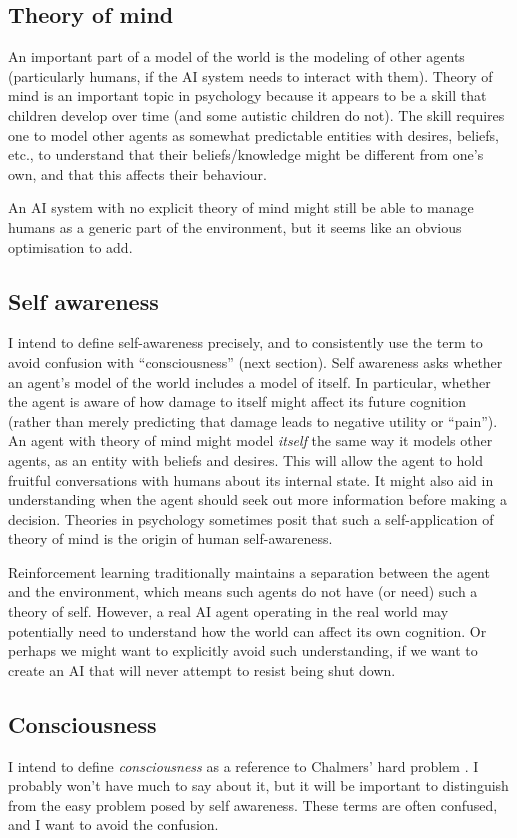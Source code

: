\documentclass[10pt,a4paper]{article}
\newcommand{\nquote}[1]{``{#1}''}
\begin{document}
\subsection{Theory of mind}
An important part of a model of the world is the modeling of other agents (particularly humans, if the AI system needs to interact with them). Theory of mind is an important topic in psychology because it appears to be a skill that children develop over time (and some autistic children do not). The skill requires one to model other agents as somewhat predictable entities with desires, beliefs, etc., to understand that their beliefs/knowledge might be different from one's own, and that this affects their behaviour.

An AI system with no explicit theory of mind might still be able to manage humans as a generic part of the environment, but it seems like an obvious optimisation to add.

\subsection{Self awareness}
I intend to define self-awareness precisely, and to consistently use the term to avoid confusion with \nquote{consciousness} (next section). Self awareness asks whether an agent's model of the world includes a model of itself. In particular, whether the agent is aware of how damage to itself might affect its future cognition (rather than merely predicting that damage leads to negative utility or \nquote{pain}). An agent with theory of mind might model \emph{itself} the same way it models other agents, as an entity with beliefs and desires. This will allow the agent to hold fruitful conversations with humans about its internal state. It might also aid in understanding when the agent should seek out more information before making a decision. Theories in psychology sometimes posit that such a self-application of theory of mind is the origin of human self-awareness.

Reinforcement learning traditionally maintains a separation between the agent and the environment, which means such agents do not have (or need) such a theory of self. However, a real AI agent operating in the real world may potentially need to understand how the world can affect its own cognition. Or perhaps we might want to explicitly avoid such understanding, if we want to create an AI that will never attempt to resist being shut down.

\subsection{Consciousness}
I intend to define \emph{consciousness} as a reference to Chalmers' hard problem \cite{chalmers}. I probably won't have much to say about it, but it will be important to distinguish from the easy problem posed by self awareness. These terms are often confused, and I want to avoid the confusion.
\end{document}
